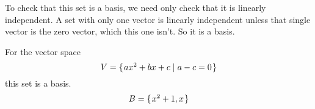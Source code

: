 \documentclass[noanswers, nolegalese, 11pt]{examjh}
\begin{document}
\begin{questions}
\begin{solution}
\begin{parts}
To check that this set is a basis, we need only check that it is 
linearly independent.
A set with only one vector is linearly independent unless that single
vector is the zero vector, which this one isn't.  
So it is a basis.
\end{parts}
\end{solution}

\question
For the vector space
\begin{equation*}
  V=\mbox{$\{\hspace{0.1em}ax^2+bx+c\mid a-c=0\hspace{0.1em}\}$}
\end{equation*}
this set is a basis.
\begin{equation*}
  B=\mbox{$\{\hspace{0.1em}x^2+1,x\hspace{0.1em}\}$}
\end{equation*}
\begin{solution}
\end{solution}


\end{questions}
\end{document}
